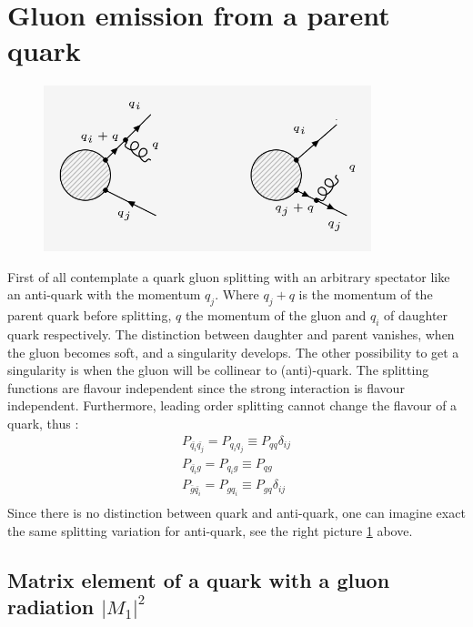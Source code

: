 \section{Gluon emission from a parent quark}
\begin{figure}[ht!]
\centering
\includegraphics[width=0.85\textwidth]{images/QQ/qqg-diagrams.png}
\label{qg}
\end{figure}
First of all contemplate a quark gluon splitting with an arbitrary spectator like an anti-quark with the momentum $ q_j $. Where $ q_j+q $ is the momentum of the parent quark before splitting, $q$ the momentum of the gluon and $q_i$ of daughter quark respectively. The distinction between daughter and parent vanishes, when the gluon becomes soft,  and a
singularity develops. The other possibility to get a singularity is when the gluon will be collinear to (anti)-quark. The splitting functions are flavour independent since the strong interaction is flavour independent. Furthermore, leading order splitting cannot change the flavour of a quark, thus \cite{halzen1984quarks}:
\begin{equation}
\begin{split}
P_{{\bar{q_i}}{\bar{q_j}}}=P_{{q_i}{q_j}}\equiv P_{{q}{q}} \delta_{ij}\\
P_{{\bar{q_i}}{{g}}}=P_{{q_i}{g}}\equiv P_{{q}{g}} \\
P_{{\bar{g}}{\bar{q_i}}}=P_{{g}{q_i}}\equiv P_{{g}{q}} \delta_{ij}\\
\end{split}
\end{equation}
Since there is no distinction between quark and anti-quark, one can imagine exact the same splitting variation for anti-quark, see the right picture \ref{qg} above.


\pagebreak
\subsection{Matrix element of a quark with a gluon radiation $ |M_1|^2 $}

